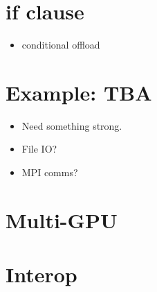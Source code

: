 \section{if clause}
\label{sec:if_clause}
\begin{itemize}
  \item conditional offload
\end{itemize}

\section{Example: TBA}
\begin{itemize}
  \item Need something strong.
  \item File IO?
  \item MPI comms?
\end{itemize}

\section{Multi-GPU}
\label{sec:multi_gpu}

\section{Interop}
\label{sec:interop}

